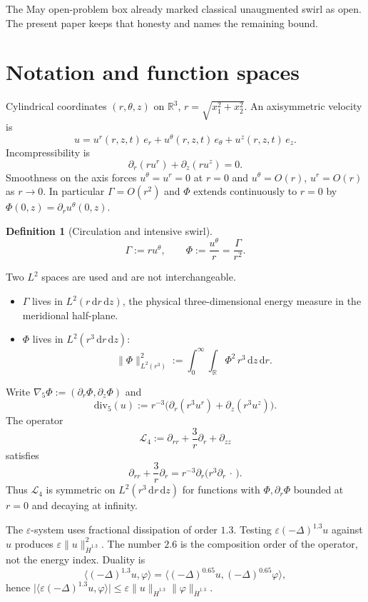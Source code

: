 \documentclass[11pt]{article}
\theoremstyle{definition}
\newtheorem{definition}[theorem]{Definition}
\newcommand{\eps}{\varepsilon}
\newcommand{\R}{\mathbb{R}}
\newcommand{\dd}{\mathrm{d}}
\newcommand{\ur}{u^{r}}
\newcommand{\uz}{u^{z}}
\newcommand{\ut}{u^{\theta}}
\newcommand{\Ph}{\Phi}
\newcommand{\Ga}{\Gamma}
\newcommand{\Lfour}{\mathcal{L}_{4}}
\newcommand{\gradfive}{\nabla_{5}}
\newcommand{\divfive}{\mathrm{div}_{5}}
\newcommand{\Hdot}{\dot{H}}
\newcommand{\norm}[2]{\|#1\|_{#2}}
\newcommand{\abs}[1]{\lvert#1\rvert}
\begin{document}
The May open-problem box already marked classical unaugmented swirl as
open. The present paper keeps that honesty and names the remaining
bound.

\section{Notation and function spaces}

Cylindrical coordinates \((r,\theta,z)\) on \(\R^3\),
\(r=\sqrt{x_1^2+x_2^2}\). An axisymmetric velocity is
\[
  u=\ur(r,z,t)\,e_r+\ut(r,z,t)\,e_\theta+\uz(r,z,t)\,e_z.
\]
Incompressibility is
\begin{equation}
  \label{eq:div3}
  \partial_r(r\ur)+\partial_z(r\uz)=0.
\end{equation}
Smoothness on the axis forces \(\ut=\ur=0\) at \(r=0\) and
\(\ut=O(r)\), \(\ur=O(r)\) as \(r\to 0\). In particular
\(\Ga=O(r^2)\) and \(\Ph\) extends continuously to \(r=0\) by
\(\Ph(0,z)=\partial_r\ut(0,z)\).

\begin{definition}[Circulation and intensive swirl]
\[
  \Ga:=r\ut,\qquad \Ph:=\frac{\ut}{r}=\frac{\Ga}{r^2}.
\]
\end{definition}

Two \(L^2\) spaces are used and are not interchangeable.
\begin{itemize}[leftmargin=1.2em]
\item \(\Ga\) lives in \(L^2(r\,\dd r\,\dd z)\), the physical
three-dimensional energy measure in the meridional half-plane.
\item \(\Ph\) lives in \(L^2(r^3\,\dd r\,\dd z)\):
\[
  \norm{\Ph}{L^2(r^3)}^2
  :=\int_0^\infty\int_{\R}\Ph^2\,r^3\,\dd z\,\dd r.
\]
\end{itemize}
Write \(\gradfive\Ph:=(\partial_r\Ph,\partial_z\Ph)\) and
\[
  \divfive(u)
  :=r^{-3}\bigl(\partial_r(r^3\ur)+\partial_z(r^3\uz)\bigr).
\]
The operator
\[
  \Lfour:=\partial_{rr}+\frac3r\partial_r+\partial_{zz}
\]
satisfies
\begin{equation}
  \label{eq:L4div}
  \partial_{rr}+\frac3r\partial_r
  =r^{-3}\partial_r\bigl(r^3\partial_r\,\cdot\,\bigr).
\end{equation}
Thus \(\Lfour\) is symmetric on \(L^2(r^3\,\dd r\,\dd z)\) for functions
with \(\Ph,\partial_r\Ph\) bounded at \(r=0\) and decaying at infinity.

The \(\eps\)-system uses fractional dissipation of order \(1.3\).
Testing \(\eps(-\Delta)^{1.3}u\) against \(u\) produces
\(\eps\norm{u}{\Hdot^{1.3}}^2\). The number \(2.6\) is the composition
order of the operator, not the energy index. Duality is
\begin{equation}
  \label{eq:dual}
  \bigl\langle(-\Delta)^{1.3}u,\varphi\bigr\rangle
  =\bigl\langle(-\Delta)^{0.65}u,(-\Delta)^{0.65}\varphi\bigr\rangle,
\end{equation}
hence
\(\abs{\langle\eps(-\Delta)^{1.3}u,\varphi\rangle}
\le\eps\norm{u}{\Hdot^{1.3}}\norm{\varphi}{\Hdot^{1.3}}\).
\end{document}

